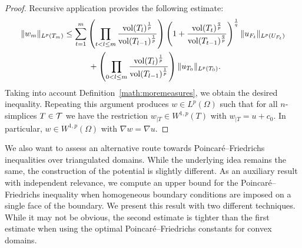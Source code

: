 \documentclass[12pt,a4paper]{article}
\begin{document}
\begin{proof}
 Recursive application provides the following estimate:
 \begin{align*}
    \| w_{m} \|_{L^{p}(T_m)}
    &\leq 
    \sum_{t=1}^{m} 
    \left( 
        \prod_{t < l \leq m} 
        \frac{ \operatorname{vol}(T_l)^{\frac 1 p} }{ \operatorname{vol}(T_{l-1})^{\frac 1 p} } 
    \right)
    \left( 1 + \frac{ \operatorname{vol}(T_t)^{\frac q p} }{ \operatorname{vol}(T_{t-1})^{\frac q p} } \right)^{\frac 1 q}
    \| u_{F_t} \|_{L^{p}(U_{F_t})}
    \\&\quad \quad \quad 
    +
    \left( 
        \prod_{0 < l \leq m} 
        \frac{ \operatorname{vol}(T_l)^{\frac 1 p} }{ \operatorname{vol}(T_{l-1})^{\frac 1 p} } 
    \right)
    \| u_{T_0}\|_{L^{p}(T_{0})}
    .
 \end{align*}
 Taking into account Definition~\eqref{math:moremeasures}, we obtain the desired inequality.
 Repeating this argument produces $w \in L^{p}(\Omega)$ 
 such that for all $n$-simplices $T \in {\mathcal T}$ we have the restriction $w_{|T} \in W^{1,p}(T)$ with $w_{|T} = u + c_{0}$.
 In particular, $w \in W^{1,p}(\Omega)$ with $\nabla w = \nabla u$.
\end{proof}








We also want to assess an alternative route towards Poincar\'e--Friedrichs inequalities over triangulated domains. 
While the underlying idea remains the same, the construction of the potential is slightly different. 
As an auxiliary result with independent relevance, we compute an upper bound for the Poincar\'e--Friedrichs inequality 
when homogeneous boundary conditions are imposed on a single face of the boundary. 
We present this result with two different techniques. 
While it may not be obvious, the second estimate is tighter than the first estimate when using the optimal Poincar\'e--Friedrichs constants for convex domains. 
\end{document}
